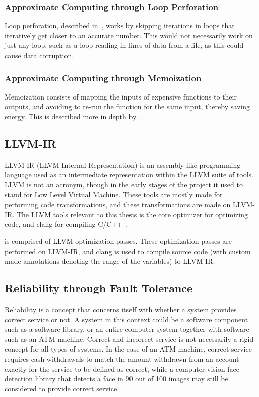 \subsubsection{Approximate Computing through Loop Perforation}

Loop perforation, described in~\citet{li2018sculptor}, works by skipping iterations in loops that iteratively get closer to an accurate number. This would not necessarily work on just any loop, such as a loop reading in lines of data from a file, as this could cause data corruption.

\subsubsection{Approximate Computing through Memoization}

Memoization consists of mapping the inputs of expensive functions to their outputs, and avoiding to re-run the function for the same input, thereby saving energy. This is described more in depth by~\citet{mittal2016survey}.

\subsection{LLVM-IR}
LLVM-IR (LLVM Internal Representation) is an assembly-like programming language used as an intermediate representation within the LLVM suite of tools. LLVM is not an acronym, though in the early stages of the project it used to stand for Low Level Virtual Machine. These tools are mostly made for performing code transformations, and these transformations are made on LLVM-IR. The LLVM tools relevant to this thesis is the core optimizer for optimizing code, and clang for compiling C/C++~\citep{LLVM_homepage}.  %

\taffo{} is comprised of LLVM optimization passes. These optimization passes are performed on LLVM-IR, and clang is used to compile source code (with custom made annotations denoting the range of the variables) to LLVM-IR. %



\subsection{Reliability through Fault Tolerance}
Reliability is a concept that concerns itself with whether a system provides correct service or not. A system in this context could be a software component such as a software library, or an entire computer system together with software such as an ATM machine. Correct and incorrect service is not necessarily a rigid concept for all types of systems. In the case of an ATM machine, correct service requires cash withdrawals to match the amount withdrawn from an account exactly for the service to be defined as correct, while a computer vision face detection library that detects a face in 90 out of 100 images may still be considered to provide correct service.

